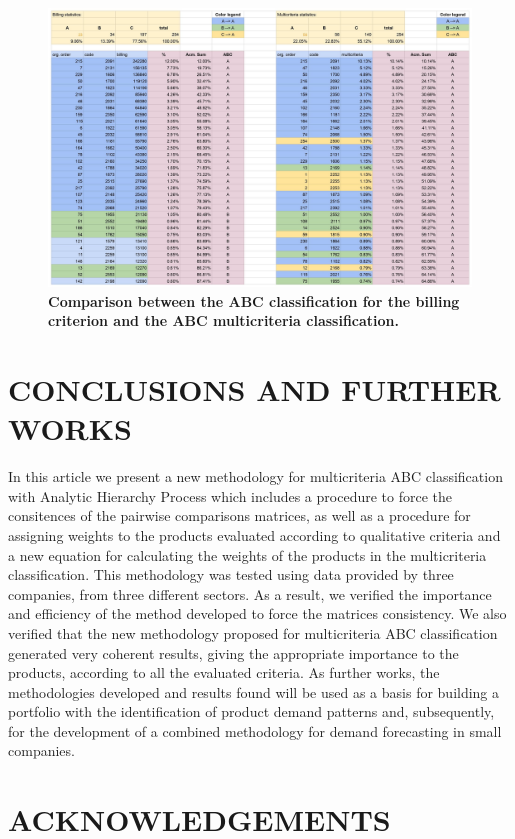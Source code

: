 \documentclass[10pt,fleqn,a4paper,twoside]{article}
\begin{document}
\begin{figure}[ht]
	\includegraphics[width=\linewidth]{files/0001.jpg}
  	\caption{\textbf{Comparison between the ABC classification for the billing criterion and the ABC multicriteria classification.}}
  	\label{fig:results}
\end{figure} 

	\section{CONCLUSIONS AND FURTHER WORKS}
    
    In this article we present a new methodology for multicriteria ABC classification with Analytic Hierarchy Process which includes a procedure to force the consitences of the pairwise comparisons matrices, as well as a procedure for assigning weights to the products evaluated according to qualitative criteria and a new equation for calculating the weights of the products in the multicriteria classification. This methodology was tested using data provided by three companies, from three different sectors. As a result, we verified the importance and efficiency of the method developed to force the matrices consistency. We also verified that the new methodology proposed for multicriteria ABC classification generated very coherent results, giving the appropriate importance to the products, according to all the evaluated criteria. As further works, the methodologies developed and results found will be used as a basis for building a portfolio with the identification of product demand patterns and, subsequently, for the development of a combined methodology for demand forecasting in small companies. 

    \section{ACKNOWLEDGEMENTS}
    
\end{document}
